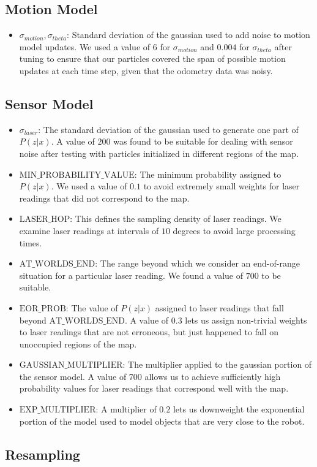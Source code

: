 \documentclass[11pt]{article}
\begin{document}
\subsection{Motion Model}
\begin{itemize}
\item $\sigma_{motion}, \sigma_{theta}$: Standard deviation of the gaussian used to add noise to motion model updates. We used a value of 6 for $\sigma_{motion}$ and $0.004$ for $\sigma_{theta}$ after tuning to ensure that our particles covered the span of possible motion updates at each time step, given that the odometry data was noisy.
\end{itemize}

\subsection{Sensor Model}
\begin{itemize}
\item $\sigma_{laser}$: The standard deviation of the gaussian used to generate one part of $P\left( z|x \right)$. A value of $200$ was found to be suitable for dealing with sensor noise after testing with particles initialized in different regions of the map.
\item $\text{MIN\_PROBABILITY\_VALUE}$: The minimum probability assigned to $P\left( z|x \right)$. We used a value of $0.1$ to avoid extremely small weights for laser readings that did not correspond to the map.
\item $\text{LASER\_HOP}$: This defines the sampling density of laser readings. We examine laser readings at intervals of $10$ degrees to avoid large processing times.
\item $\text{AT\_WORLDS\_END}$: The range beyond which we consider an end-of-range situation for a particular laser reading. We found a value of $700$ to be suitable.
\item $\text{EOR\_PROB}$: The value of $P\left( z|x \right)$ assigned to laser readings that fall beyond $\text{AT\_WORLDS\_END}$. A value of $0.3$ lets us assign non-trivial weights to laser readings that are not erroneous, but just happened to fall on unoccupied regions of the map.
\item $\text{GAUSSIAN\_MULTIPLIER}$: The multiplier applied to the gaussian portion of the sensor model. A value of 700 allows us to achieve sufficiently high probability values for laser readings that correspond well with the map.
\item $\text{EXP\_MULTIPLIER}$: A multiplier of $0.2$ lets us downweight the exponential portion of the model used to model objects that are very close to the robot.
\end{itemize}

\subsection{Resampling}
\end{document}
